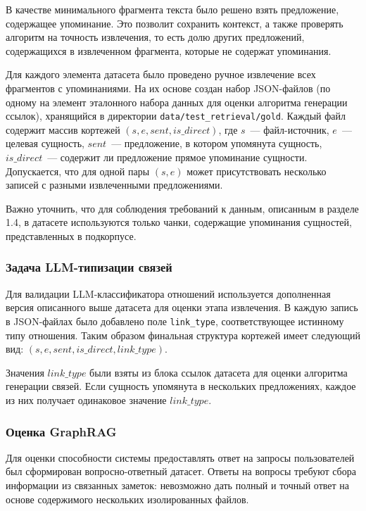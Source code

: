 В качестве минимального фрагмента текста было решено взять предложение,
содержащее упоминание. Это позволит сохранить контекст,
а также проверять алгоритм на точность извлечения,
то есть долю других предложений,
содержащихся в извлеченном фрагмента, которые не содержат упоминания.

Для каждого элемента датасета было проведено
ручное извлечение всех фрагментов с упоминаниями.
На их основе создан набор JSON-файлов
(по одному на элемент эталонного набора данных для оценки алгоритма генерации ссылок),
хранящийся в директории \texttt{data/test\_retrieval/gold}.
Каждый файл содержит массив кортежей \((s, e, sent, is\_direct)\),
где \(s\)~--- файл-источник,
\(e\)~--- целевая сущность,
\(sent\)~--- предложение, в котором упомянута сущность,
\(is\_direct\)~--- содержит ли предложение прямое упоминание сущности.
Допускается, что для одной пары
\((s,e)\) может присутствовать несколько
записей с разными извлеченными предложениями.

Важно уточнить, что для соблюдения требований к данным,
описанным в разделе 1.4,
в датасете используются только чанки,
содержащие упоминания сущностей, представленных в подкорпусе.

\subsubsection{Задача LLM-типизации связей}

Для валидации LLM-классификатора отношений используется дополненная
версия описанного выше датасета для оценки этапа извлечения.
В каждую запись в JSON-файлах было добавлено поле
\texttt{link\_type}, соответствующее истинному типу отношения.
Таким образом финальная структура кортежей имеет следующий вид:
\((s, e, sent, is\_direct, link\_type)\).

Значения \(link\_type\) были взяты из блока ссылок
датасета для оценки алгоритма генерации связей.
Если сущность упомянута в нескольких
предложениях, каждое из них получает одинаковое значение
\(link\_type\).

\subsubsection{Оценка GraphRAG}

Для оценки способности системы предоставлять ответ на запросы пользователей
был сформирован вопросно-ответный датасет.
Ответы на вопросы требуют сбора информации из связанных заметок:
невозможно дать полный и точный ответ на основе содержимого нескольких изолированных файлов.

